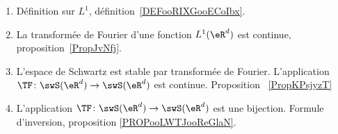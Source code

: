 
\begin{enumerate}
	\item
	      Définition sur \( L^1\), définition~\ref{DEFooRIXGooECoIbx}.
	\item
	      La transformée de Fourier d'une fonction \( L^1(\eR^d)\) est continue, proposition~\ref{PropJvNfj}.
	\item
	      L'espace de Schwartz est stable par transformée de Fourier. L'application \( \TF\colon \swS(\eR^d)\to \swS(\eR^d)\) est continue. Proposition ~\ref{PropKPsjyzT}
	\item
	      L'application \( \TF\colon \swS(\eR^d)\to \swS(\eR^d)\) est une bijection. Formule d'inversion, proposition \ref{PROPooLWTJooReGlaN}.
\end{enumerate}

